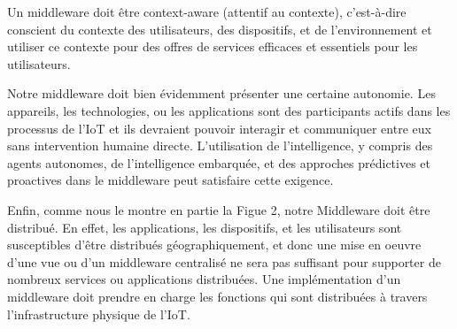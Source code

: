 Un middleware doit être context-aware (attentif au contexte), c'est-à-dire conscient du contexte des utilisateurs, des dispositifs, et de l’environnement et utiliser ce contexte pour des offres de services efficaces et essentiels pour les utilisateurs.

Notre middleware doit bien évidemment présenter une certaine autonomie. Les appareils, les technologies, ou les applications sont des participants actifs dans les processus de l'IoT et ils devraient pouvoir interagir et communiquer entre eux sans intervention humaine directe. L'utilisation de l'intelligence, y compris des agents autonomes, de l’intelligence embarquée, et des approches prédictives et proactives dans le middleware peut satisfaire cette exigence.

Enfin, comme nous le montre en partie la Figue 2, notre Middleware doit être distribué. En effet, les applications, les dispositifs, et les utilisateurs sont susceptibles d'être distribués géographiquement, et donc une mise en oeuvre d’une vue ou d’un middleware centralisé ne sera pas suffisant pour supporter de nombreux services ou applications distribuées. Une implémentation d'un middleware doit prendre en charge les fonctions qui sont distribuées à travers l'infrastructure physique de l'IoT.